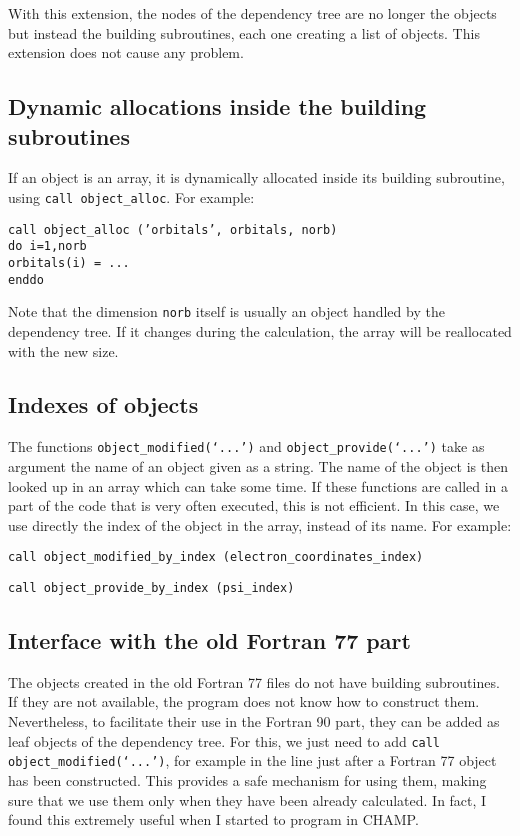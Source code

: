\documentclass[a4paper,11pt]{article}
\begin{document}
\vspace{0.5cm}
With this extension, the nodes of the dependency tree are no longer the objects but instead the building subroutines, each one creating a list of objects. This extension does not cause any problem.

\subsection{Dynamic allocations inside the building subroutines}

If an object is an array, it is dynamically allocated inside its building subroutine, using {\tt call object\_alloc}. For example:

\vspace{0.5cm}
\noindent
{\tt call object\_alloc ('orbitals', orbitals, norb)\\
do i=1,norb\\
\phantom{xx} orbitals(i) = ...\\
enddo}

Note that the dimension {\tt norb} itself is usually an object handled by the dependency tree. If it changes during the calculation, the array will be reallocated with the new size.

\subsection{Indexes of objects}
The functions {\tt object\_modified(`...')} and {\tt object\_provide(`...')} take as argument the name of an object given as a string. The name of the object is then looked up in an array which can take some time. If these functions are called in a part of the code that is very often executed, this is not efficient. In this case, we use directly the index of the object in the array, instead of its name. For example:

\vspace{0.5cm}
\noindent
{\tt call object\_modified\_by\_index (electron\_coordinates\_index)}

\vspace{0.5cm}
\noindent
{\tt call object\_provide\_by\_index (psi\_index)}


\subsection{Interface with the old Fortran 77 part}

The objects created in the old Fortran 77 files do not have building subroutines. If they are not available, the program does not know how to construct them. Nevertheless, to facilitate their use in the Fortran 90 part, they can be added as leaf objects of the dependency tree. For this, we just need to add {\tt call object\_modified(`...')}, for example in the line just after a Fortran 77 object has been constructed. This provides a safe mechanism for using them, making sure that we use them only when they have been already calculated. In fact, I found this extremely useful when I started to program in CHAMP. 
\end{document}
